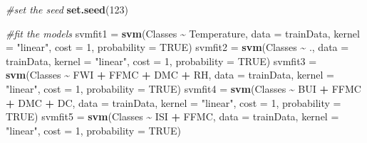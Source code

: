 \documentclass[
]{article}
\newenvironment{Shaded}{\begin{snugshade}}{\end{snugshade}}
\newcommand{\AttributeTok}[1]{\textcolor[rgb]{0.13,0.29,0.53}{#1}}
\newcommand{\CommentTok}[1]{\textcolor[rgb]{0.56,0.35,0.01}{\textit{#1}}}
\newcommand{\ConstantTok}[1]{\textcolor[rgb]{0.56,0.35,0.01}{#1}}
\newcommand{\DecValTok}[1]{\textcolor[rgb]{0.00,0.00,0.81}{#1}}
\newcommand{\FunctionTok}[1]{\textcolor[rgb]{0.13,0.29,0.53}{\textbf{#1}}}
\newcommand{\NormalTok}[1]{#1}
\newcommand{\OtherTok}[1]{\textcolor[rgb]{0.56,0.35,0.01}{#1}}
\newcommand{\SpecialCharTok}[1]{\textcolor[rgb]{0.81,0.36,0.00}{\textbf{#1}}}
\newcommand{\StringTok}[1]{\textcolor[rgb]{0.31,0.60,0.02}{#1}}
\begin{document}
\begin{Shaded}
\begin{Highlighting}[]
\CommentTok{\#set the seed}
\FunctionTok{set.seed}\NormalTok{(}\DecValTok{123}\NormalTok{)}

\CommentTok{\#fit the models}
\NormalTok{svmfit1 }\OtherTok{=} \FunctionTok{svm}\NormalTok{(Classes }\SpecialCharTok{\textasciitilde{}}\NormalTok{ Temperature, }\AttributeTok{data =}\NormalTok{ trainData, }\AttributeTok{kernel =} \StringTok{"linear"}\NormalTok{, }\AttributeTok{cost =} \DecValTok{1}\NormalTok{, }\AttributeTok{probability =} \ConstantTok{TRUE}\NormalTok{)}
\NormalTok{svmfit2 }\OtherTok{=} \FunctionTok{svm}\NormalTok{(Classes }\SpecialCharTok{\textasciitilde{}}\NormalTok{ ., }\AttributeTok{data =}\NormalTok{ trainData, }\AttributeTok{kernel =} \StringTok{"linear"}\NormalTok{, }\AttributeTok{cost =} \DecValTok{1}\NormalTok{, }\AttributeTok{probability =} \ConstantTok{TRUE}\NormalTok{)}
\NormalTok{svmfit3 }\OtherTok{=} \FunctionTok{svm}\NormalTok{(Classes }\SpecialCharTok{\textasciitilde{}}\NormalTok{ FWI }\SpecialCharTok{+}\NormalTok{ FFMC }\SpecialCharTok{+}\NormalTok{ DMC }\SpecialCharTok{+}\NormalTok{ RH, }\AttributeTok{data =}\NormalTok{ trainData, }\AttributeTok{kernel =} \StringTok{"linear"}\NormalTok{, }\AttributeTok{cost =} \DecValTok{1}\NormalTok{, }\AttributeTok{probability =} \ConstantTok{TRUE}\NormalTok{)}
\NormalTok{svmfit4 }\OtherTok{=} \FunctionTok{svm}\NormalTok{(Classes }\SpecialCharTok{\textasciitilde{}}\NormalTok{ BUI }\SpecialCharTok{+}\NormalTok{ FFMC }\SpecialCharTok{+}\NormalTok{ DMC }\SpecialCharTok{+}\NormalTok{ DC, }\AttributeTok{data =}\NormalTok{ trainData, }\AttributeTok{kernel =} \StringTok{"linear"}\NormalTok{, }\AttributeTok{cost =} \DecValTok{1}\NormalTok{, }\AttributeTok{probability =} \ConstantTok{TRUE}\NormalTok{)}
\NormalTok{svmfit5 }\OtherTok{=} \FunctionTok{svm}\NormalTok{(Classes }\SpecialCharTok{\textasciitilde{}}\NormalTok{ ISI }\SpecialCharTok{+}\NormalTok{ FFMC, }\AttributeTok{data =}\NormalTok{ trainData, }\AttributeTok{kernel =} \StringTok{"linear"}\NormalTok{, }\AttributeTok{cost =} \DecValTok{1}\NormalTok{, }\AttributeTok{probability =} \ConstantTok{TRUE}\NormalTok{)}


\end{Highlighting}
\end{Shaded}
\end{document}
